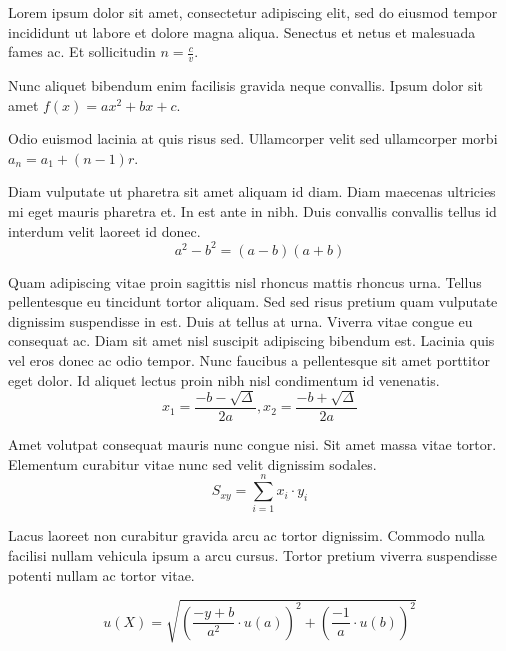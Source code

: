 \documentclass{article}
\begin{document}
Lorem ipsum dolor sit amet, consectetur adipiscing elit, sed do eiusmod tempor incididunt ut labore et dolore magna aliqua. Senectus et netus et malesuada fames ac. Et sollicitudin \begin{math}
	n=\frac{c}{v}
\end{math}.\newline
 
Nunc aliquet bibendum enim facilisis gravida neque convallis. Ipsum dolor sit amet $ f(x)=ax^2+bx+c $.\newline
    
Odio euismod lacinia at quis risus sed. Ullamcorper velit sed ullamcorper morbi \( a_n=a_1+(n-1)r \).\newline

Diam vulputate ut pharetra sit amet aliquam id diam. Diam maecenas ultricies mi eget mauris pharetra et. In est ante in nibh. Duis convallis convallis tellus id interdum velit laoreet id donec. 
\[ a^2-b^2=(a-b)(a+b) \]

Quam adipiscing vitae proin sagittis nisl rhoncus mattis rhoncus urna. Tellus pellentesque eu tincidunt tortor aliquam. Sed sed risus pretium quam vulputate dignissim suspendisse in est. Duis at tellus at urna. Viverra vitae congue eu consequat ac. Diam sit amet nisl suscipit adipiscing bibendum est. Lacinia quis vel eros donec ac odio tempor. Nunc faucibus a pellentesque sit amet porttitor eget dolor. Id aliquet lectus proin nibh nisl condimentum id venenatis.
$$ x_1=\frac{-b-\sqrt{\Delta}}{2a},x_2=\frac{-b+\sqrt{\Delta}}{2a} $$

Amet volutpat consequat mauris nunc congue nisi. Sit amet massa vitae tortor. Elementum curabitur vitae nunc sed velit dignissim sodales. 
\begin{displaymath}
	S_{xy}=\sum_{i=1}^{n}x_i\cdot y_i
\end{displaymath}

Lacus laoreet non curabitur gravida arcu ac tortor dignissim. Commodo nulla facilisi nullam vehicula ipsum a arcu cursus. Tortor pretium viverra suspendisse potenti nullam ac tortor vitae. 

\begin{equation}
	u(X)=\sqrt{(\frac{-y+b}{a^2}\cdot u(a))^2+(\frac{-1}{a}\cdot u(b))^2}
\end{equation}
\end{document}
